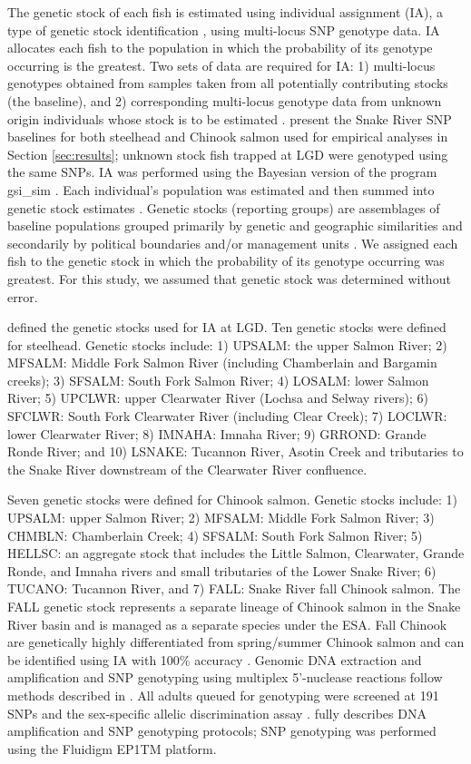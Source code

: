 \documentclass[11pt]{article}
\begin{document}
The genetic stock of each fish is estimated using individual assignment (IA), a type of genetic stock identification  \cite{Pella1987,Shaklee1999}, using multi-locus SNP genotype data. IA allocates each fish to the population in which the probability of its genotype occurring is the greatest. Two sets of data are required for IA: 1) multi-locus genotypes obtained from samples taken from all potentially contributing stocks (the baseline), and 2) corresponding multi-locus genotype data from unknown origin individuals whose stock is to be estimated \cite{Koljonen2005}.  present the Snake River SNP baselines for both steelhead and Chinook salmon used for empirical analyses in Section \ref{sec:results}; unknown stock fish trapped at LGD were genotyped using the same SNPs. IA was performed using the Bayesian version of the program gsi\_sim \cite{Anderson2008,Anderson2010}. Each individual's population was estimated and then summed into genetic stock estimates  \cite{Wood1987}. Genetic stocks (reporting groups) are assemblages of baseline populations grouped primarily by genetic and geographic similarities and secondarily by political boundaries and/or management units \cite{Ackerman2011}. We assigned each fish to the genetic stock in which the probability of its genotype occurring was greatest. For this study, we assumed that genetic stock was determined without error.

 defined the genetic stocks used for IA at LGD. Ten genetic stocks were defined for steelhead. Genetic stocks include: 1) UPSALM: the upper Salmon River; 2) MFSALM: Middle Fork Salmon River (including Chamberlain and Bargamin creeks); 3) SFSALM: South Fork Salmon River; 4) LOSALM: lower Salmon River; 5) UPCLWR: upper Clearwater River (Lochsa and Selway rivers); 6) SFCLWR: South Fork Clearwater River (including Clear Creek); 7) LOCLWR: lower Clearwater River; 8) IMNAHA: Imnaha River; 9) GRROND: Grande Ronde River; and 10) LSNAKE: Tucannon River, Asotin Creek and tributaries to the Snake River downstream of the Clearwater River confluence.

Seven genetic stocks were defined for Chinook salmon. Genetic stocks include: 1) UPSALM: upper Salmon River; 2) MFSALM: Middle Fork Salmon River; 3) CHMBLN: Chamberlain Creek; 4) SFSALM: South Fork Salmon River; 5) HELLSC: an aggregate stock that includes the Little Salmon, Clearwater, Grande Ronde, and Imnaha rivers and small tributaries of the Lower Snake River; 6) TUCANO: Tucannon River, and 7) FALL: Snake River fall Chinook salmon. The FALL genetic stock represents a separate lineage of Chinook salmon in the Snake River basin and is managed as a separate species under the ESA. Fall Chinook are genetically highly differentiated from spring/summer Chinook salmon and can be identified using IA with 100\% accuracy \cite{Ackerman2014}. Genomic DNA extraction and amplification and SNP genotyping using multiplex 5’-nuclease reactions follow methods described in . All adults queued for genotyping were screened at 191 SNPs and the sex-specific allelic discrimination assay \cite{Campbell2012}.   fully describes DNA amplification and SNP genotyping protocols; SNP genotyping was performed using the Fluidigm EP1TM platform. 
\end{document}
